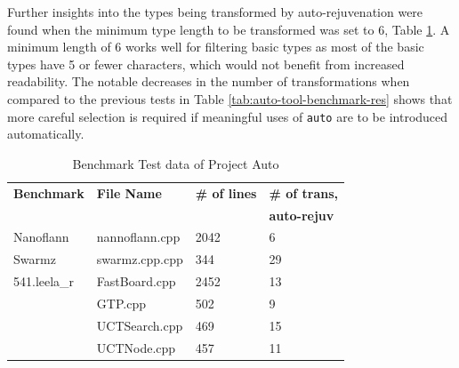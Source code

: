 \documentclass[bsc,frontabs,singlespacing,twoside,parskip,deptreport]{infthesis}
\begin{document}
Further insights into the types being transformed by auto-rejuvenation were found when the minimum type length to be transformed was set to 6, Table \ref{tab:auto-tool-benchmark-type-limit}. A minimum length of 6 works well for filtering basic types as most of the basic types have 5 or fewer characters, which would not benefit from increased readability. The notable decreases in the number of transformations when compared to the previous tests in Table \ref{tab:auto-tool-benchmark-res} shows that more careful selection is required if meaningful uses of \texttt{auto} are to be introduced automatically.




\begin{table}[H]
    \begin{center}
        \begin{tabular}{| l | l | l | l |}
            \hline
            \textbf{Benchmark}    & \textbf{File Name}    & \textbf{\# of lines}  & \textbf{\# of trans,} \\
                                  &                       &                       & \textbf{auto-rejuv}   \\ \hline
            Nanoflann    & nannoflann.cpp   & 2042  & 6  \\ \hline
            Swarmz       & swarmz.cpp.cpp   & 344   & 29 \\ \hline
            541.leela\_r & FastBoard.cpp    & 2452	& 13 \\ \hline
                         & GTP.cpp          & 502	& 9  \\ \hline
                         & UCTSearch.cpp    & 469   & 15 \\ \hline
                         & UCTNode.cpp	    & 457   & 11 \\ \hline
        \end{tabular}
        \caption{Benchmark Test data of Project Auto }
        \label{tab:auto-tool-benchmark-type-limit}
    \end{center}
\end{table}
\end{document}
